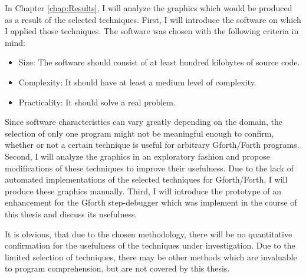 In Chapter \ref{chap:Results}, I will analyze the graphics which would be produced as a result of the selected techniques.
First, I will introduce the software on which I applied those techniques. The software was chosen with the following criteria in mind:
\begin{itemize}
\item Size: The software should consist of at least hundred kilobytes of source code.
\item Complexity: It should have at least a medium level of complexity.
\item Practicality: It should solve a real problem.
\end{itemize}
Since software characteristics can vary greatly depending on the domain, the selection of only one program might not be meaningful enough to confirm, whether or not a certain technique is useful for arbitrary Gforth/Forth programs.
Second, I will analyze the graphics in an exploratory fashion and propose modifications of these techniques to improve their usefulness. Due to the lack of automated implementations of the selected techniques for Gforth/Forth, I will produce these graphics manually.
Third, I will introduce the prototype of an enhancement for the Gforth step-debugger which was implement in the course of this thesis and discuss its usefulness.

It is obvious, that due to the chosen methodology, there will be no quantitative confirmation for the usefulness of the techniques under investigation. Due to the limited selection of techniques, there may be other methods which are invaluable to program comprehension, but are not covered by this thesis.